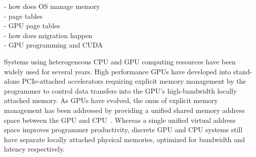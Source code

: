 {\color{red}
- how does OS manage memory\\
- page tables\\
- GPU page tables\\
- how does migration happen\\
- GPU programming and CUDA\\
}

Systems using heterogeneous CPU and GPU computing resources have been widely
used for several years.
High performance GPUs have developed into stand-alone PCIe-attached
accelerators requiring explicit memory management by the programmer to control
data transfers into the GPU's high-bandwidth locally attached memory. As GPUs
have evolved, the onus of explicit memory management has been addressed by
providing a unified shared memory address space between the GPU and
CPU~\cite{UVM,HSA}.  Whereas a single unified virtual address space improves
programmer productivity, discrete GPU and CPU systems still have separate
locally attached physical memories, optimized for bandwidth and latency
respectively. 


